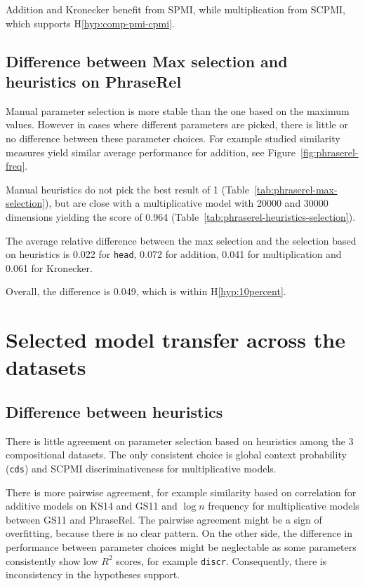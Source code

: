 Addition and Kronecker benefit from SPMI, while multiplication from SCPMI, which supports H\ref{hyp:comp-pmi-cpmi}.

\subsection{Difference between Max selection and heuristics on PhraseRel}
\label{sec:diff-phraserel}

Manual parameter selection is more stable than the one based on the maximum values. However in cases where different parameters are picked, there is little or no difference between these parameter choices. For example studied similarity measures yield similar average performance for addition, see Figure~\ref{fig:phraserel-freq}.

Manual heuristics do not pick the best result of 1 (Table~\ref{tab:phraserel-max-selection}), but are close with a multiplicative model with 20000 and 30000 dimensions yielding the score of 0.964 (Table~\ref{tab:phraserel-heuristics-selection}).

The average relative difference between the max selection and the selection based on heuristics is 0.022 for \texttt{head}, 0.072 for addition, 0.041 for multiplication and 0.061 for Kronecker.

Overall, the difference is 0.049, which is within H\ref{hyp:10percent}.

\section{Selected model transfer across the datasets}
\label{sec:select-model-transf-comp}

\subsection{Difference between heuristics}
\label{sec:diff-betw-heur-comp}

There is little agreement on parameter selection based on heuristics among the 3 compositional datasets. The only consistent choice is global context probability (\texttt{cds}) and SCPMI discriminativeness for multiplicative models.

There is more pairwise agreement, for example similarity based on correlation for additive models on KS14 and GS11 and $\log n$ frequency for multiplicative models between GS11 and PhraseRel. The pairwise agreement might be a sign of overfitting, because there is no clear pattern. On the other side, the difference in performance between parameter choices might be neglectable as some parameters consistently show low $R^2$ scores, for example \texttt{discr}. Consequently, there is inconsistency in the hypotheses support.

